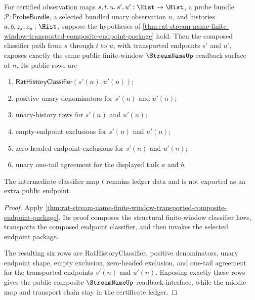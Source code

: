 \begin{theorem}
\label{thm:streamname-transported-window-composite-public-readback}
For certified observation maps $s,t,u,s',u':\Hist\to\Hist$, a probe bundle
$\mathcal{P}:\mathsf{ProbeBundle}$, a selected bundled unary observation $n$,
and histories $a,b,z_s,z_u:\Hist$, suppose the hypotheses of
\autoref{thm:rat-stream-name-finite-window-transported-composite-endpoint-package}
hold. Then the composed classifier path from $s$ through $t$ to $u$, with
transported endpoints $s'$ and $u'$, exposes exactly the same public
finite-window $\StreamNameUp$ readback surface at $n$. Its public rows are
\begin{enumerate}
  \item $\mathsf{RatHistoryClassifier}(s'(n),u'(n))$;
  \item positive unary denominators for $s'(n)$ and $u'(n)$;
  \item unary-history rows for $s'(n)$ and $u'(n)$;
  \item empty-endpoint exclusions for $s'(n)$ and $u'(n)$;
  \item zero-headed endpoint exclusions for $s'(n)$ and $u'(n)$;
  \item unary one-tail agreement for the displayed tails $a$ and $b$.
\end{enumerate}
The intermediate classifier map $t$ remains ledger data and is not exported as
an extra public endpoint.
\end{theorem}
\begin{proof}
Apply
\autoref{thm:rat-stream-name-finite-window-transported-composite-endpoint-package}.
Its proof composes the structural finite-window classifier laws, transports
the composed endpoint classifier, and then invokes the selected endpoint
package.

The resulting six rows are RatHistoryClassifier, positive denominators, unary
endpoint shape, empty exclusion, zero-headed exclusion, and one-tail agreement
for the transported endpoints $s'(n)$ and $u'(n)$. Exposing exactly these rows
gives the public composite $\StreamNameUp$ readback interface, while the middle
map and transport chain stay in the certificate ledger.
\end{proof}

